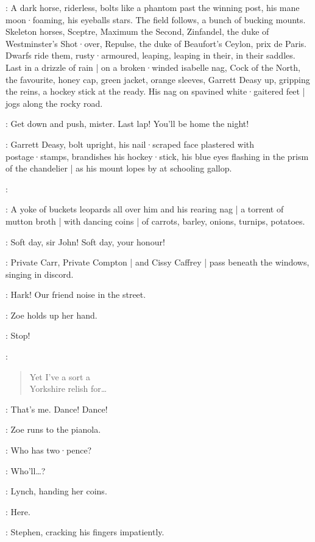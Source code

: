 :
A dark horse,
riderless,
bolts like a phantom past the winning post,
his mane moon·foaming,
his eyeballs stars.
The field follows,
a bunch of bucking mounts.
Skeleton horses,
Sceptre,
Maximum the Second,
Zinfandel,
the duke of Westminster's Shot·over,
Repulse,
the duke of Beaufort's Ceylon,
prix de Paris.
Dwarfs ride them,
rusty·armoured,
leaping,
leaping in their,
in their saddles.
Last in a drizzle of rain |
on a broken·winded isabelle nag,
%
Cock of the North,
the favourite,
honey cap,
green jacket,
orange sleeves,
Garrett Deasy up,
gripping the reins,
a hockey stick at the ready.
His nag on spavined white·gaitered feet |
jogs along the rocky road.

\OrangeLodges[2]:
Get down and push,
mister.
Last lap!
You'll be home the night!

:
Garrett Deasy,
bolt upright,
his nail·scraped face plastered with postage·stamps,
brandishes his hockey·stick,
his blue eyes flashing in the prism of the chandelier |
as his mount lopes by at schooling gallop.

\GarrettDeasy:

:
A yoke of buckets leopards all over him and his rearing nag |
%
a torrent of mutton broth |
with dancing coins |
of carrots,
barley,
onions,
turnips,
potatoes.

\GreenLodges[2]:
Soft day,
sir John!
Soft day,
your honour!

:
Private Carr,
Private Compton |
and Cissy Caffrey |
pass beneath the windows,
singing in discord.

\Stephen:
Hark!
Our friend noise in the street.

:
Zoe holds up her hand.

\Zoe:
Stop!

\CarrComptonCissy[2]:
\begin{verse}
    Yet I've a sort a\\
    Yorkshire relish for…
\end{verse}

\Zoe:
That's me.
Dance!
Dance!

:
Zoe runs to the pianola.

\Zoe:
Who has two·pence?

\Bloom:
Who'll…?

:
Lynch,
handing her coins.

\Lynch:
Here.

:
Stephen,
cracking his fingers impatiently.

